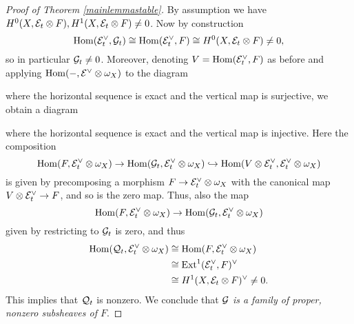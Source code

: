\documentclass[letterpaper,12pt]{amsart}
\theoremstyle{remark}
\begin{document}
\begin{proof}[Proof of Theorem \ref{mainlemmastable}]
By assumption we have $H^0(X, \mathcal{E}_t \otimes F), H^1(X, \mathcal{E}_t \otimes F) \neq 0$. Now by construction
\[ \mathrm{Hom}(\mathcal{E}_t^\vee, \mathcal{G}_t) \cong \mathrm{Hom}(\mathcal{E}_t^\vee, F) \cong H^0(X, \mathcal{E}_t \otimes F) \neq 0, \]
so in particular $\mathcal{G}_t \neq 0$. Moreover, denoting $V = \mathrm{Hom}(\mathcal{E}_t^\vee, F)$ as before and applying $\mathrm{Hom}(-, \mathcal{E}^\vee \otimes \omega_X)$ to the diagram
\begin{center}
\end{center}
where the horizontal sequence is exact and the vertical map is surjective, we obtain a diagram
\begin{center}
\end{center}
where the horizontal sequence is exact and the vertical map is injective. Here the composition
\[ \mathrm{Hom}(F, \mathcal{E}_t^\vee \otimes \omega_X) \to \mathrm{Hom}(\mathcal{G}_t, \mathcal{E}_t^\vee \otimes \omega_X) \hookrightarrow \mathrm{Hom}(V \otimes \mathcal{E}_t^\vee, \mathcal{E}_t^\vee \otimes \omega_X) \]
is given by precomposing a morphism $F \to \mathcal{E}_t^\vee \otimes \omega_X$ with the canonical map $V \otimes \mathcal{E}_t^\vee \to F$, and so is the zero map. Thus, also the map
\[ \mathrm{Hom}(F, \mathcal{E}_t^\vee \otimes \omega_X) \to \mathrm{Hom}(\mathcal{G}_t, \mathcal{E}_t^\vee \otimes \omega_X) \]
given by restricting to $\mathcal{G}_t$ is zero, and thus 
\begin{align*}
    \mathrm{Hom}(\mathcal{Q}_t, \mathcal{E}_t^\vee \otimes \omega_X) & \cong \mathrm{Hom}(F, \mathcal{E}_t^\vee \otimes \omega_X) \\
    & \cong \mathrm{Ext}^1(\mathcal{E}_t^\vee, F)^\vee \\
    & \cong H^1(X, \mathcal{E}_t \otimes F)^\vee \neq 0.
\end{align*}
This implies that $\mathcal{Q}_t$ is nonzero. We conclude that \emph{$\mathcal{G}$ is a family of proper, nonzero subsheaves of $F$}.


\end{proof}
\end{document}
